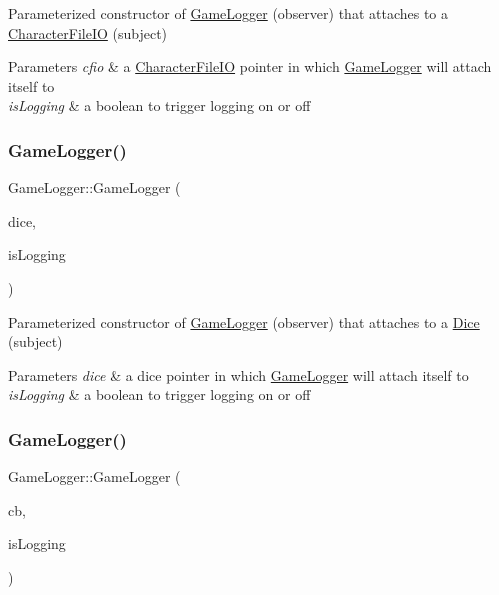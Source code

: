 Parameterized constructor of \hyperlink{class_game_logger}{Game\+Logger} (observer) that attaches to a \hyperlink{class_character_file_i_o}{Character\+File\+IO} (subject) 
\begin{DoxyParams}{Parameters}
{\em cfio} & a \hyperlink{class_character_file_i_o}{Character\+File\+IO} pointer in which \hyperlink{class_game_logger}{Game\+Logger} will attach itself to \\
\hline
{\em is\+Logging} & a boolean to trigger logging on or off \\
\hline
\end{DoxyParams}
\hypertarget{class_game_logger_a93d74c59e640bada3e3c75169097c707}{}\label{class_game_logger_a93d74c59e640bada3e3c75169097c707} 
\subsubsection{\texorpdfstring{Game\+Logger()}{GameLogger()}\hspace{0.1cm}{\footnotesize\ttfamily [5/7]}}
{\footnotesize\ttfamily Game\+Logger\+::\+Game\+Logger (\begin{DoxyParamCaption}\item[{\hyperlink{class_dice}{Dice} $\ast$}]{dice,  }\item[{bool}]{is\+Logging }\end{DoxyParamCaption})}

Parameterized constructor of \hyperlink{class_game_logger}{Game\+Logger} (observer) that attaches to a \hyperlink{class_dice}{Dice} (subject) 
\begin{DoxyParams}{Parameters}
{\em dice} & a dice pointer in which \hyperlink{class_game_logger}{Game\+Logger} will attach itself to \\
\hline
{\em is\+Logging} & a boolean to trigger logging on or off \\
\hline
\end{DoxyParams}
\hypertarget{class_game_logger_a5d1efdad4b6b8dd65c9480acde00bd99}{}\label{class_game_logger_a5d1efdad4b6b8dd65c9480acde00bd99} 
\subsubsection{\texorpdfstring{Game\+Logger()}{GameLogger()}\hspace{0.1cm}{\footnotesize\ttfamily [6/7]}}
{\footnotesize\ttfamily Game\+Logger\+::\+Game\+Logger (\begin{DoxyParamCaption}\item[{\hyperlink{class_character_builder}{Character\+Builder} $\ast$}]{cb,  }\item[{bool}]{is\+Logging }\end{DoxyParamCaption})}

